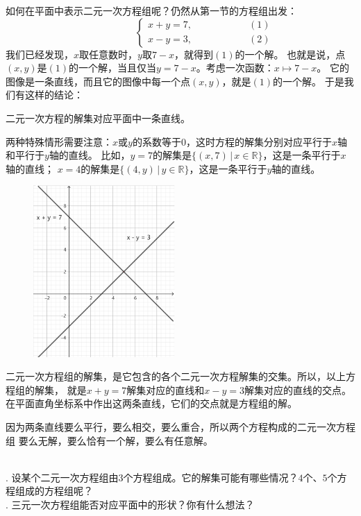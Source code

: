 \documentclass[12pt,UTF8]{ctexbook}
\begin{document}
如何在平面中表示二元一次方程组呢？仍然从第一节的方程组出发：
$$ \quad \quad \quad \quad \quad\left\{
\begin{array}{cr}
     x + y = 7, & \quad \quad \quad \quad \quad (1) \\
     x - y = 3, & \quad \quad \quad \quad \quad (2)
\end{array}\right.
$$
我们已经发现，$x$取任意数时，$y$取$7 - x$，就得到$(1)$的一个解。
也就是说，点$(x, y)$是$(1)$的一个解，当且仅当$y = 7 - x$。考虑一次函数：$x \mapsto 7 - x$。
它的图像是一条直线，而且它的图像中每一个点$(x, y)$，就是$(1)$的一个解。
于是我们有这样的结论：
\begin{tm}
    二元一次方程的解集对应平面中一条直线。
\end{tm}
两种特殊情形需要注意：$x$或$y$的系数等于$0$，这时方程的解集分别对应平行于$x$轴和平行于$y$轴的直线。
比如，$y = 7$的解集是$\{(x, 7) \,|\, x\in\mathbb{R}\}$，这是一条平行于$x$轴的直线；
$x = 4$的解集是$\{(4, y) \,|\, y\in\mathbb{R}\}$，这是一条平行于$y$轴的直线。

\begin{figure} %
    \vspace{-15pt}
    \flushright
    \includegraphics[width=0.48\textwidth]{tu/二元一次方程组.png}
\end{figure}

二元一次方程组的解集，是它包含的各个二元一次方程解集的交集。所以，以上方程组的解集，
就是$x + y = 7$解集对应的直线和$x - y = 3$解集对应的直线的交点。
在平面直角坐标系中作出这两条直线，它们的交点就是方程组的解。

因为两条直线要么平行，要么相交，要么重合，所以两个方程构成的二元一次方程组
要么无解，要么恰有一个解，要么有任意解。

\begin{sk}\label{sk:6-3-0}
    \mbox{}\\
    . 设某个二元一次方程组由$3$个方程组成。它的解集可能有哪些情况？$4$个、$5$个方程组成的方程组呢？\\
    . 三元一次方程组能否对应平面中的形状？你有什么想法？
\end{sk}
\end{document}
